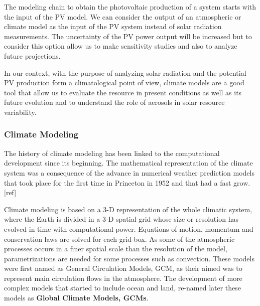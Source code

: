 The modeling chain to obtain the photovoltaic production of a system starts with the input of the PV model. We can consider the output of an atmospheric or climate model as the input of the PV system instead of solar radiation measurements. The uncertainty of the PV power output will be increased but to consider this option allow us to  make sensitivity studies and also to analyze future projections.
 

In our context, with the purpose of analyzing solar radiation and the potential PV production form a climatological point of view, climate models are a good tool that allow us to evaluate the resource in present conditions as well as its future evolution and to understand the role of aerosols in solar resource variability.

\subsubsection{Climate Modeling}

The history of climate modeling has been linked to the computational development since its beginning. The mathematical representation of the climate system was a consequence of the advance in numerical weather prediction models that took place for the first time in Princeton in 1952 and that had a fast grow. [ref]%

Climate modeling is based on a 3-D representation of the whole climatic system, where the Earth is divided  in a 3-D spatial grid whose size or resolution has evolved in time with computational power. Equations of motion, momentum and conservation laws are solved for each grid-box. As some of the atmospheric processes occurs in a finer spatial scale than the resolution of the model, parametrizations are needed for some processes such as convection. These models were first named as General Circulation Models, GCM, as their aimed was to represent main circulation flows in the atmosphere. The development of more complex models that started to include ocean and land, re-named later these models as \textbf{Global Climate Models, GCMs}. 

